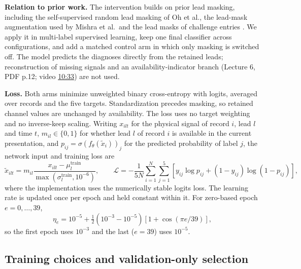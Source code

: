 \textbf{Relation to prior work.} The intervention builds on prior lead masking, including the self-supervised random lead masking of Oh et al., the lead-mask augmentation used by Mishra et al.\ and the lead masks of challenge entries \citep{oh2022leadagnostic,fast2026af,reyna2022issues}. We apply it in multi-label supervised learning, keep one final classifier across configurations, and add a matched control arm in which only masking is switched off. The model predicts the diagnoses directly from the retained leads; reconstruction of missing signals and an availability-indicator branch (Lecture 6, PDF p.12; video \href{https://youtu.be/AeDzGhM1GBU?t=633}{10:33}) \citep{md6329lecture06} are not used.

\textbf{Loss.} Both arms minimize unweighted binary cross-entropy with logits, averaged over records and the five targets. Standardization precedes masking, so retained channel values are unchanged by availability. The loss uses no target weighting and no inverse-keep scaling. Writing $x_{ilt}$ for the physical signal of record $i$, lead $l$ and time $t$, $m_{il}\in\{0,1\}$ for whether lead $l$ of record $i$ is available in the current presentation, and $p_{ij}=\sigma(f_\theta(\widetilde{x}_i))_j$ for the predicted probability of label $j$, the network input and training loss are
\begin{equation}
\widetilde{x}_{ilt}=m_{il}\frac{x_{ilt}-\mu_l^{\mathrm{train}}}{\max(\sigma_l^{\mathrm{train}},10^{-6})},\qquad
\mathcal{L}=-\frac{1}{5N}\sum_{i=1}^{N}\sum_{j=1}^{5}
\left[y_{ij}\log p_{ij}+(1-y_{ij})\log(1-p_{ij})\right],
\end{equation}
where the implementation uses the numerically stable logits loss. The learning rate is updated once per epoch and held constant within it. For zero-based epoch $e=0,\ldots,39$,
\begin{equation}
\eta_e=10^{-5}+\tfrac12(10^{-3}-10^{-5})\left[1+\cos(\pi e/39)\right],
\end{equation}
so the first epoch uses $10^{-3}$ and the last ($e=39$) uses $10^{-5}$.

\subsection{Training choices and validation-only selection}
\label{sec:training}

